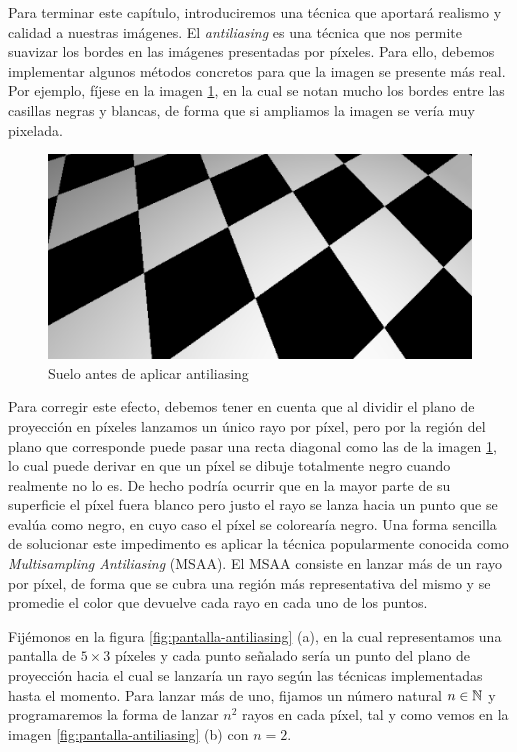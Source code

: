 Para terminar este capítulo, introduciremos una técnica que aportará realismo y calidad a nuestras imágenes. El \textit{antiliasing} es una técnica que nos permite suavizar los bordes en las imágenes presentadas por píxeles. Para ello, debemos implementar algunos métodos concretos para que la imagen se presente más real. Por ejemplo, fíjese en la imagen \ref{fig:no-antiliasing}, en la cual se notan mucho los bordes entre las casillas negras y blancas, de forma que si ampliamos la imagen se vería muy pixelada.

\begin{figure} [ht]
    \centering
    \includegraphics[scale = 0.5]{img/C7/no-antiliasing.png}
    \caption{Suelo antes de aplicar antiliasing}
    \label{fig:no-antiliasing}
\end{figure}

Para corregir este efecto, debemos tener en cuenta que al dividir el plano de proyección en píxeles lanzamos un único rayo por píxel, pero por la región del plano que corresponde puede pasar una recta diagonal como las de la imagen \ref{fig:no-antiliasing}, lo cual puede derivar en que un píxel se dibuje totalmente negro cuando realmente no lo es. De hecho podría ocurrir que en la mayor parte de su superficie el píxel fuera blanco pero justo el rayo se lanza hacia un punto que se evalúa como negro, en cuyo caso el píxel se colorearía negro. Una forma sencilla de solucionar este impedimento es aplicar la técnica popularmente conocida como \textit{Multisampling Antiliasing} (MSAA). El MSAA consiste en lanzar más de un rayo por píxel, de forma que se cubra una región más representativa del mismo y se promedie el color que devuelve cada rayo en cada uno de los puntos.

Fijémonos en la figura \ref{fig:pantalla-antiliasing} (a), en la cual representamos una pantalla de $5\times 3$ píxeles y cada punto señalado sería un punto del plano de proyección hacia el cual se lanzaría un rayo según las técnicas implementadas hasta el momento. Para lanzar más de uno, fijamos un número natural $n\in\mathbb{N}$ y programaremos la forma de lanzar $n^2$ rayos en cada píxel, tal y como vemos en la imagen \ref{fig:pantalla-antiliasing} (b) con $n=2$.

